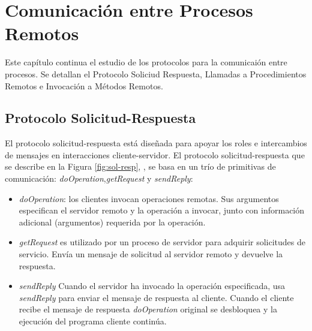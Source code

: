 

\chapter{Comunicación entre Procesos Remotos }
\label{ch:Comunicación entre Procesos}

Este capítulo continua el estudio de los protocolos para la comunicaión entre procesos. Se detallan el Protocolo Soliciud Respuesta, Llamadas a Procedimientos Remotos e Invocación a Métodos Remotos.

\section{Protocolo Solicitud-Respuesta}
\label{sec:sol-resp}

El protocolo solicitud-respuesta  está diseñada para apoyar los roles e intercambios de mensajes en interacciones cliente-servidor. El \gls{protocolo solicitud-respuesta} que se describe en la Figura \ref{fig:sol-resp}, \cite{Steen2017} \cite{Coulouris2011},  se basa en un trío de primitivas de comunicación: \textit{doOperation},\textit{getRequest} y \textit{sendReply}:

\begin{itemize} 
	\item \textit{doOperation}: los clientes invocan operaciones remotas. Sus argumentos especifican el servidor remoto y la operación a invocar, junto con información adicional (argumentos) requerida por la operación. 
	
	\item \textit{getRequest} es utilizado por un proceso de servidor para adquirir solicitudes de servicio.  Envía un mensaje de solicitud al servidor remoto y devuelve la respuesta.   
	
	\item \textit{sendReply} Cuando el servidor ha invocado la operación especificada, usa \textit{sendReply} para enviar el mensaje de respuesta al cliente.
	Cuando el cliente recibe el mensaje de respuesta \textit{doOperation} original se desbloquea y la ejecución del programa cliente continúa.   
\end{itemize}

